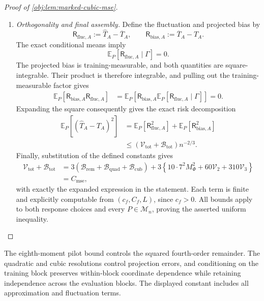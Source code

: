 \documentclass[11pt]{article}
\begin{document}
\begin{proof}[Proof of \cref{obj:lem:marked-cubic-mse}]
\begin{enumerate}
\item \textit{Orthogonality and final assembly.}
Define the fluctuation and projected bias by
\[
\mathsf R_{\mathrm{fluc},A}:=\widehat T_A-\overline T_A,
\qquad
\mathsf R_{\mathrm{bias},A}:=\overline T_A-T_A.
\]
The exact conditional means imply
\[
\mathbb E_P[\mathsf R_{\mathrm{fluc},A}\mid\Gamma]=0.
\]
The projected bias is training-measurable, and both quantities are square-integrable. Their product is therefore integrable, and pulling out the training-measurable factor gives
\[
\begin{aligned}
\mathbb E_P[
\mathsf R_{\mathrm{bias},A}\mathsf R_{\mathrm{fluc},A}]
&=
\mathbb E_P\!\left[
\mathsf R_{\mathrm{bias},A}
\mathbb E_P[\mathsf R_{\mathrm{fluc},A}\mid\Gamma]
\right]
=0.
\end{aligned}
\]
Expanding the square consequently gives the exact risk decomposition
\[
\begin{aligned}
\mathbb E_P[(\widehat T_A-T_A)^2]
&=
\mathbb E_P[\mathsf R_{\mathrm{fluc},A}^2]
+\mathbb E_P[\mathsf R_{\mathrm{bias},A}^2]\\
&\le
(\mathcal V_{\mathrm{tot}}+\mathcal B_{\mathrm{tot}})n^{-2/3}.
\end{aligned}
\]
Finally, substitution of the defined constants gives
\[
\begin{aligned}
\mathcal V_{\mathrm{tot}}+\mathcal B_{\mathrm{tot}}
&=
3\left(
\mathcal B_{\mathrm{rem}}
+\mathcal B_{\mathrm{quad}}
+\mathcal B_{\mathrm{cub}}
\right)
+3\left\{
10\cdot7^2M_\Phi^2
+60\mathcal V_2+310\mathcal V_3
\right\}\\
&=C_{\mathrm{mse}},
\end{aligned}
\]
with exactly the expanded expression in the statement. Each term is finite and explicitly computable from \((c_f,C_f,L)\), since \(c_f>0\). All bounds apply to both response choices and every \(P\in\mathcal M_n\), proving the asserted uniform inequality.
\end{enumerate}
\end{proof}

The eighth-moment pilot bound controls the squared fourth-order remainder. The quadratic and cubic resolutions control projection errors, and conditioning on the training block preserves within-block coordinate dependence while retaining independence across the evaluation blocks. The displayed constant includes all approximation and fluctuation terms.
\end{document}
